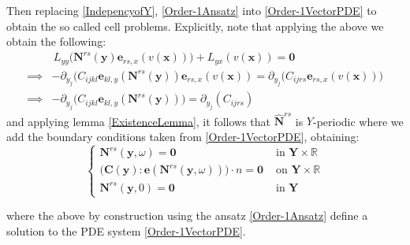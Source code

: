 Then replacing \ref{IndepencyofY}, \ref{Order-1Ansatz} into \ref{Order-1VectorPDE} to obtain the so called cell problems. Explicitly, note that applying the above we obtain the following:
\begin{align*}
    &\,L_{yy} \big( \mathbf{N}^{rs} (\mathbf{y}) \mathbf{e}_{rs,x} (v(\mathbf{x})) \big) + L_{yx}(v(\mathbf{x}) ) = \mathbf{0} \\
    \implies& -\partial_{y_j} \big( C_{ijkl}\mathbf{e}_{kl,y}(\mathbf{N}^{rs}(\mathbf{y}) ) \mathbf{e}_{rs,x}(v(\mathbf{x})) = \partial_{y_j} \big( C_{ijrs}\mathbf{e}_{rs,x}(v(\mathbf{x})) \big) \\
    \implies& - \partial_{y_j} \big( C_{ijkl} \mathbf{e}_{kl,y} (\mathbf{N}^{rs}(\mathbf{y})) \big) = \partial_{y_j} (C_{ijrs})
\end{align*}
and applying lemma \ref{ExistenceLemma}, it follows that $\hat{\mathbf{N}}^{rs}$ is $Y$-periodic where we add the boundary conditions taken from \ref{Order-1VectorPDE}, obtaining:
\begin{equation*}
    \left \{
    \begin{array}{cc}
        \mathbf{N}^{rs}(\mathbf{y}, \omega) = \mathbf{0} & \text{ in } \mathbf{Y} \times \mathbb{R} \\
        \big( \mathbf{C}(\mathbf{y}) : \mathbf{e}(\mathbf{N}^{rs}(\mathbf{y}, \omega)) \big) \cdot n = \mathbf{0} & \text{ on } \mathbf{Y}\times \mathbb{R}  \\
        \mathbf{N}^{rs} (\mathbf{y},0) = \mathbf{0} &  \text{ in } \mathbf{Y}
    \end{array}
    \right.
\end{equation*}

where the above by construction using the ansatz \ref{Order-1Ansatz} define a solution to the PDE system \ref{Order-1VectorPDE}.


